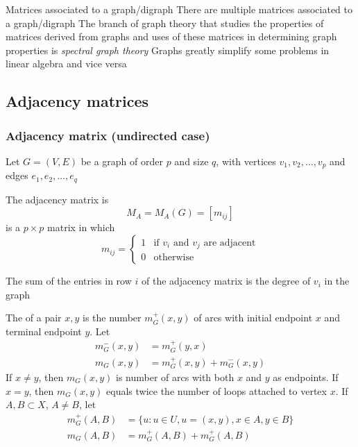 \documentclass[aspectratio=43]{beamer}
\begin{document}
\begin{frame}{Matrices associated to a graph/digraph}
	There are multiple matrices associated to a graph/digraph
	\vfill
	The branch of graph theory that studies the properties of matrices derived from graphs and uses of these matrices in determining graph properties is \emph{spectral graph theory}
	\vfill
	Graphs greatly simplify some problems in linear algebra and vice versa
\end{frame}

\subsection{Adjacency matrices}


\begin{frame}\frametitle{Adjacency matrix (undirected case)}
	Let $G=(V,E)$ be a graph of order $p$ and size $q$, with vertices $v_1, v_2, \dots , v_p$ and edges $e_1, e_2, \dots , e_q$
	\begin{definition}
		The adjacency matrix is $$M_A=M_A(G)=[m_{ij}]$$ is a $p\times p$ matrix in which
		$$m_{ij}=\left \{ 
		\begin{array}{cc}
			1 & \textrm{if } v_i \textrm{ and } v_j \textrm{ are adjacent}\\
			0 & \textrm{otherwise}
		\end{array}
		\right .
		$$
	\end{definition}
\end{frame}

\begin{frame}
	\begin{theorem}
		The sum of the entries in row $i$ of the adjacency matrix is the degree of $v_i$ in the graph
	\end{theorem}
\end{frame}

\begin{frame}
	\begin{definition}
		The  of a pair $x,y$ is the number $m_G^+(x,y)$ of arcs with initial endpoint $x$ and terminal endpoint $y$. Let
		\begin{align*}
			m_G^-(x,y) &= m_G^+(y,x) \\
			m_G(x,y) &= m_G^+(x,y)+m_G^-(x,y)
		\end{align*}
		If $x\neq y$, then $m_G(x,y)$ is number of arcs with both $x$ and $y$ as endpoints. If $x=y$, then $m_G(x,y)$ equals twice the number of loops attached to vertex $x$. If $A,B\subset X$, $A\neq B$, let
		\begin{align*}
			m_G^+(A,B) &= \{u:u\in U, u=(x,y),x\in A,y\in B\} \\
			m_G(A,B) &= m_G^+(A,B)+m_G^+(A,B)
		\end{align*}
	\end{definition}
\end{frame}
\end{document}
